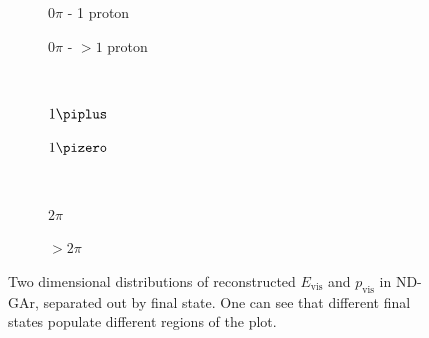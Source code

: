 \begin{figure}[t]
	\begin{subfigure}[t]{.5\linewidth}
		\begin{adjustbox}{max totalsize=\linewidth, center}
			
		\end{adjustbox}
		\caption{$0\pi$ - 1 proton}
	\end{subfigure}
	\hfill
	\begin{subfigure}[t]{.5\linewidth}
		\begin{adjustbox}{max totalsize=\linewidth, center}
			
		\end{adjustbox}
		\caption{$0\pi$ - $>1$ proton}
	\end{subfigure} \\
	\begin{subfigure}[t]{.5\linewidth}
		\begin{adjustbox}{max totalsize=\linewidth, center}
			
		\end{adjustbox}
		\caption{$1\piplus$}
	\end{subfigure}
	\hfill
	\begin{subfigure}[t]{.5\linewidth}
		\begin{adjustbox}{max totalsize=\linewidth, center}
			
		\end{adjustbox}
		\caption{$1\pizero$}
	\end{subfigure} \\
	\begin{subfigure}[t]{.5\linewidth}
		\begin{adjustbox}{max totalsize=\linewidth, center}
			
		\end{adjustbox}
		\caption{$2\pi$}
	\end{subfigure}
	\hfill
	\begin{subfigure}[t]{.5\linewidth}
		\begin{adjustbox}{max totalsize=\linewidth, center}
			
		\end{adjustbox}
		\caption{$>2\pi$}
	\end{subfigure}
	\caption[Two dimensional distributions of $E_{\text{vis}}$ and $p_{\text{vis}}$ in ND-GAr]{Two dimensional distributions of reconstructed $E_{\text{vis}}$ and $p_{\text{vis}}$ in ND-GAr, separated out by final state. One can see that different final states populate different regions of the plot.}
	\label{fig:q0q3Genie}
\end{figure}

